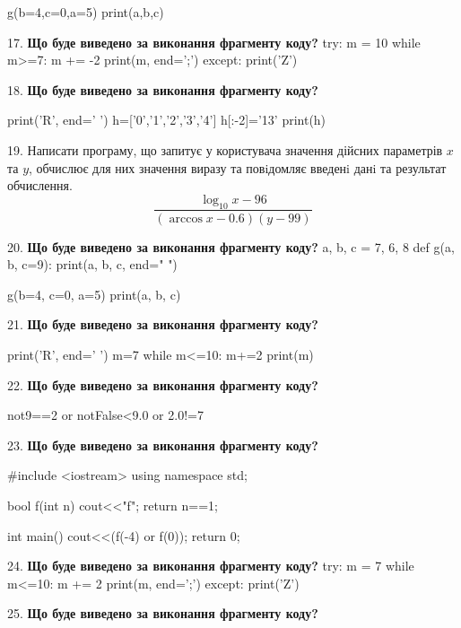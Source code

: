 \documentclass[11pt]{article}
\begin{document}
g(b=4,c=0,a=5)
print(a,b,c)
\par\vspace{5mm}
17. \textbf{Що буде виведено за виконання фрагменту коду?}
try:
    m = 10
    while m>=7:
        m += -2
    print(m, end=';')
except:
    print('Z')
\par\vspace{5mm}
18. \textbf{Що буде виведено за виконання фрагменту коду?}

print('R', end=' ')
h=['0','1','2','3','4']
h[:-2]='13'
print(h)

\par\vspace{5mm}
19. 
Написати програму, що запитує у користувача значення дійсних параметрів $x$ та $y$, обчислює для них значення виразу та повiдомляє введенi данi та результат обчислення.
$$\frac{\log_{10} x - 96}{(\arccos x - 0.6) (y - 99)}$$ 

\par\vspace{5mm}
20. \textbf{Що буде виведено за виконання фрагменту коду?}
a, b, c = 7, 6, 8
def g(a, b, c=9):
    print(a, b, c, end=" ")

g(b=4, c=0, a=5)
print(a, b, c)
\par\vspace{5mm}
21. \textbf{Що буде виведено за виконання фрагменту коду?}

print('R', end=' ')
m=7
while m<=10:
    m+=2
print(m)

\par\vspace{5mm}
22. \textbf{Що буде виведено за виконання фрагменту коду?}

not9==2 or notFalse<9.0 or 2.0!=7
\par\vspace{5mm}
23. \textbf{Що буде виведено за виконання фрагменту коду?}

#include <iostream>
using namespace std;

bool f(int n){
    cout<<"f";
    return n==1;
}

int main(){
    cout<<(f(-4) or f(0));
    return 0;
}
\par\vspace{5mm}
24. \textbf{Що буде виведено за виконання фрагменту коду?}
try:
    m = 7
    while m<=10:
        m += 2
    print(m, end=';')
except:
    print('Z')
\par\vspace{5mm}
25. \textbf{Що буде виведено за виконання фрагменту коду?}
\end{document}
